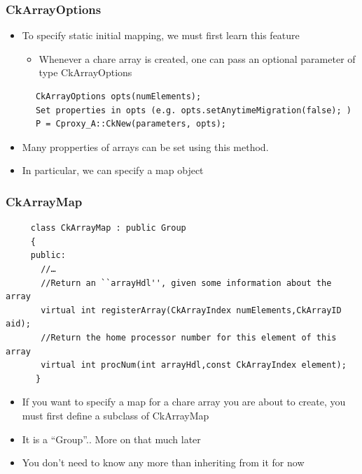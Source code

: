 \documentclass{beamer}
\begin{document}
\begin{frame}[fragile]
    \frametitle{CkArrayOptions}
    \begin{itemize}
      \item To specify static initial mapping, we must first learn this feature
      \begin{itemize}
        \item Whenever a chare array is created, one can pass an optional
        parameter of type CkArrayOptions
      \end{itemize}
    \end{itemize}
      \begin{lstlisting}
      CkArrayOptions opts(numElements);
      Set properties in opts (e.g. opts.setAnytimeMigration(false); )
      P = Cproxy_A::CkNew(parameters, opts);
      \end{lstlisting}
    \begin{itemize}
      \item Many propperties of arrays can be set using this method.
      \item In particular, we can specify a map object
    \end{itemize}
\end{frame}

\begin{frame}[fragile]
    \frametitle{CkArrayMap}
    \begin{lstlisting}
     class CkArrayMap : public Group
     {
     public:
       //…
       //Return an ``arrayHdl'', given some information about the array
       virtual int registerArray(CkArrayIndex numElements,CkArrayID aid);
       //Return the home processor number for this element of this array
       virtual int procNum(int arrayHdl,const CkArrayIndex element);
      }
    \end{lstlisting}
    \begin{itemize}
    \item If you want to specify a map for a chare array you are about to
    create, you must first define a subclass of CkArrayMap
    \item It is a “Group”.. More on that much later
    \item You don’t need to know any more than inheriting from it for now
    \end{itemize}
\end{frame}
\end{document}
